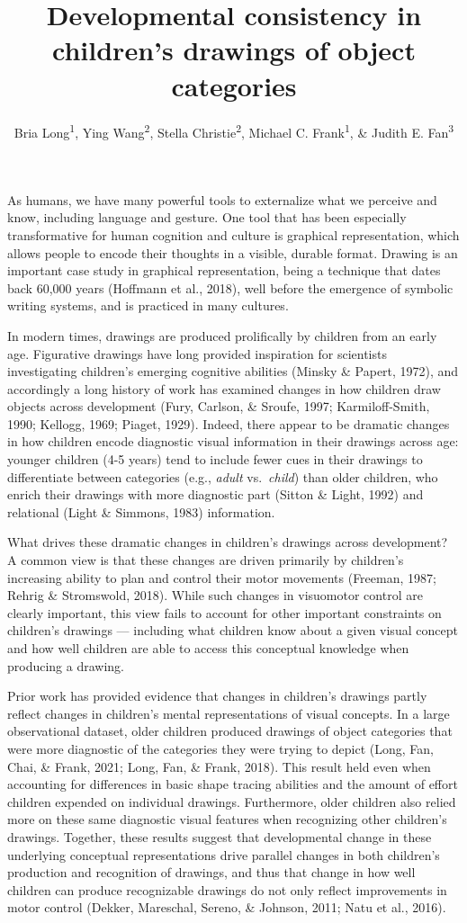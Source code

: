 \documentclass[
  man]{apa6}
\title{Developmental consistency in children's drawings of object categories}
\author{Bria Long\textsuperscript{1}, Ying Wang\textsuperscript{2}, Stella Christie\textsuperscript{2}, Michael C. Frank\textsuperscript{1}, \& Judith E. Fan\textsuperscript{3}}
\date{}
\affiliation{\vspace{0.5cm}\textsuperscript{1} Stanford University\\\textsuperscript{2} Tsinghua University\\\textsuperscript{3} University of California, San Diego}
\begin{document}
\maketitle

As humans, we have many powerful tools to externalize what we perceive and know, including language and gesture.
One tool that has been especially transformative for human cognition and culture is graphical representation, which allows people to encode their thoughts in a visible, durable format.
Drawing is an important case study in graphical representation, being a technique that dates back 60,000 years (Hoffmann et al., 2018), well before the emergence of symbolic writing systems, and is practiced in many cultures.

In modern times, drawings are produced prolifically by children from an early age.
Figurative drawings have long provided inspiration for scientists investigating children's emerging cognitive abilities (Minsky \& Papert, 1972), and accordingly a long history of work has examined changes in how children draw objects across development (Fury, Carlson, \& Sroufe, 1997; Karmiloff-Smith, 1990; Kellogg, 1969; Piaget, 1929).
Indeed, there appear to be dramatic changes in how children encode diagnostic visual information in their drawings across age: younger children (4-5 years) tend to include fewer cues in their drawings to differentiate between categories (e.g., \textit{adult} vs.~\textit{child}) than older children, who enrich their drawings with more diagnostic part (Sitton \& Light, 1992) and relational (Light \& Simmons, 1983) information.

What drives these dramatic changes in children's drawings across development?
A common view is that these changes are driven primarily by children's increasing ability to plan and control their motor movements (Freeman, 1987; Rehrig \& Stromswold, 2018).
While such changes in visuomotor control are clearly important, this view fails to account for other important constraints on children's drawings --- including what children know about a given visual concept and how well children are able to access this conceptual knowledge when producing a drawing.

Prior work has provided evidence that changes in children's drawings partly reflect changes in children's mental representations of visual concepts. In a large observational dataset, older children produced drawings of object categories that were more diagnostic of the categories they were trying to depict (Long, Fan, Chai, \& Frank, 2021; Long, Fan, \& Frank, 2018). This result held even when accounting for differences in basic shape tracing abilities and the amount of effort children expended on individual drawings. Furthermore, older children also relied more on these same diagnostic visual features when recognizing other children's drawings.
Together, these results suggest that developmental change in these underlying conceptual representations drive parallel changes in both children's production and recognition of drawings, and thus that change in how well children can produce recognizable drawings do not only reflect improvements in motor control (Dekker, Mareschal, Sereno, \& Johnson, 2011; Natu et al., 2016).
\end{document}
